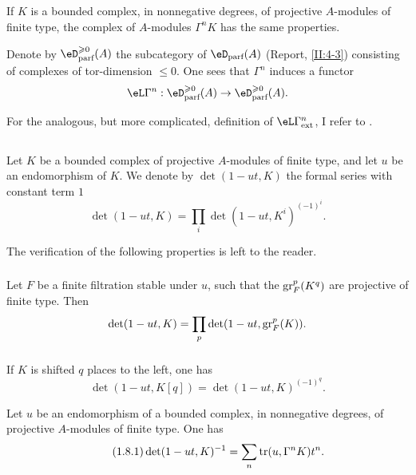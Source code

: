 \subsection{}\label{III:1-6}

If $K$ is a bounded complex, in nonnegative degrees, of projective
$A$-modules of finite type, the complex of $A$-modules $\Gamma^n K$ has the
same properties.

Denote by $\eD_\text{parf}^{\geqslant 0}(A)$ the subcategory of
$\eD_\text{parf}(A)$ (Report, \ref{II:4-3}) consisting of complexes of
tor-dimension $\leqslant 0$. One sees that $\Gamma^n$ induces a functor
\[
  \eL\Gamma^n : \eD_\text{parf}^{\geqslant 0}(A) \to \eD_\text{parf}^{\geqslant 0}(A) \text{.}
\]

For the analogous, but more complicated, definition of
$\eL\Gamma_\text{ext}^n$, I refer to \cite[XVII 5.5.14]{sga4}.






\subsection{}\label{III:1-7}

Let $K$ be a bounded complex of projective $A$-modules of finite type, and let
$u$ be an endomorphism of $K$. We denote by $\det(1-u t,K)$ the formal series
with constant term $1$
\[
  \det(1-u t,K) = \prod_i \det(1-u t,K^i)^{(-1)^i} \text{.}
\]

The verification of the following properties is left to the reader.


\subsubsection{}\label{III:1-7-1}

Let $F$ be a finite filtration stable under $u$, such that the
$\operatorname{gr}_F^p(K^q)$ are projective of finite type. Then
\[
  \det(1-u t,K) = \prod_p \det(1-u t,\operatorname{gr}_F^p(K)) \text{.}
\]


\subsubsection{}\label{III:1-7-2}

If $K$ is shifted $q$ places to the left, one has
\[
  \det(1-u t,K[q]) = \det(1-u t,K)^{(-1)^q} \text{.}
\]






\begin{proposition_}\label{III:1-8}
Let $u$ be an endomorphism of a bounded complex, in nonnegative degrees, of
projective $A$-modules of finite type. One has \
\begin{equation*}\tag{1.8.1}\label{III:eq:1-8-1}
  \det(1-u t,K)^{-1} = \sum_n \operatorname{tr}(u,\Gamma^n K) t^n \text{.}
\end{equation*}
\end{proposition_}

